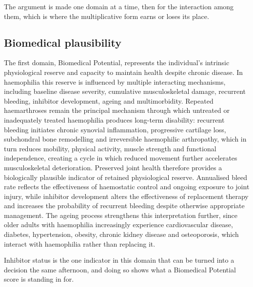 The argument is made one domain at a time, then for the interaction among
them, which is where the multiplicative form earns or loses its place.

\subsection{Biomedical plausibility}

The first domain, Biomedical Potential, represents the individual's intrinsic physiological reserve and capacity to maintain health despite chronic disease. In haemophilia this reserve is influenced by multiple interacting mechanisms, including baseline disease severity, cumulative musculoskeletal damage, recurrent bleeding, inhibitor development, ageing and multimorbidity. Repeated haemarthroses remain the principal mechanism through which untreated or inadequately treated haemophilia produces long-term disability: recurrent bleeding initiates chronic synovial inflammation, progressive cartilage loss, subchondral bone remodelling and irreversible haemophilic arthropathy, which in turn reduces mobility, physical activity, muscle strength and functional independence, creating a cycle in which reduced movement further accelerates musculoskeletal deterioration. Preserved joint health therefore provides a biologically plausible indicator of retained physiological reserve. Annualised bleed rate reflects the effectiveness of haemostatic control and ongoing exposure to joint injury, while inhibitor development alters the effectiveness of replacement therapy and increases the probability of recurrent bleeding despite otherwise appropriate management. The ageing process strengthens this interpretation further, since older adults with haemophilia increasingly experience cardiovascular disease, diabetes, hypertension, obesity, chronic kidney disease and osteoporosis, which interact with haemophilia rather than replacing it.

Inhibitor status is the one indicator in this domain that can be turned into a
decision the same afternoon, and doing so shows what a Biomedical Potential
score is standing in for.

